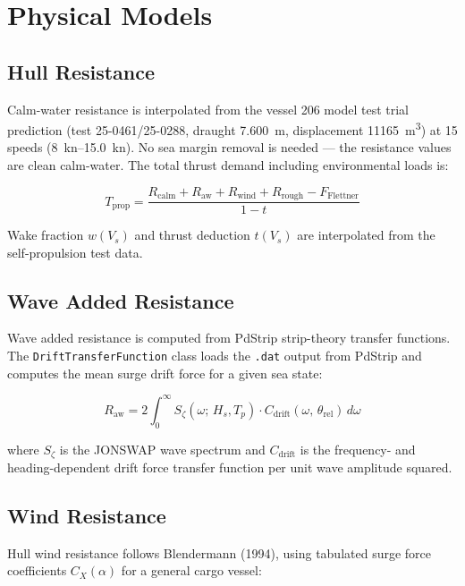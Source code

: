 \documentclass[a4paper,11pt]{article}
\begin{document}
\section{Physical Models}
\label{sec:org5de2acc}
\subsection{Hull Resistance}
\label{sec:org6fe67e8}

Calm-water resistance is interpolated from the vessel 206 model test trial
prediction (test 25-0461/25-0288, draught \SI{7.600}{\metre}, displacement
\SI{11165}{\metre\cubed}) at 15 speeds (\SIrange{8}{15.0}{\knot}).  No sea
margin removal is needed --- the resistance values are clean calm-water.  The
total thrust demand including environmental loads is:

\begin{equation}
  T_\text{prop} = \frac{R_\text{calm} + R_\text{aw} + R_\text{wind} + R_\text{rough} - F_\text{Flettner}}{1 - t}
\end{equation}

Wake fraction \(w(V_s)\) and thrust deduction \(t(V_s)\) are interpolated from
the self-propulsion test data.

\subsection{Wave Added Resistance}
\label{sec:org76c0b5f}

Wave added resistance is computed from PdStrip strip-theory transfer functions.
The \texttt{DriftTransferFunction} class loads the \texttt{.dat} output from PdStrip and
computes the mean surge drift force for a given sea state:

\begin{equation}
  R_\text{aw} = 2 \int_0^\infty S_\zeta(\omega;\, H_s, T_p)
                  \cdot C_\text{drift}(\omega,\, \theta_\text{rel})
                  \, d\omega
\end{equation}

where \(S_\zeta\) is the JONSWAP wave spectrum and \(C_\text{drift}\) is the
frequency- and heading-dependent drift force transfer function per unit wave
amplitude squared.

\subsection{Wind Resistance}
\label{sec:orgeb044fc}

Hull wind resistance follows Blendermann (1994), using tabulated surge force
coefficients \(C_X(\alpha)\) for a general cargo vessel:
\end{document}
